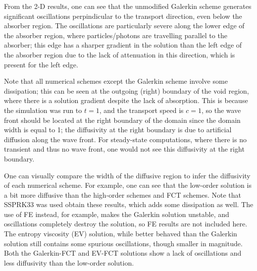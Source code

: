 From the 2-D results, one can see that the unmodified Galerkin scheme
generates significant oscillations perpindicular to the transport
direction, even below the absorber region. The oscillations are
particularly severe along the lower edge of the absorber region,
where particles/photons are travelling parallel to the absorber;
this edge has a sharper gradient in the solution than the left
edge of the absorber region due to the lack of attenuation in
this direction, which is present for the left edge.

Note that all numerical schemes except the Galerkin scheme involve some
dissipation; this can be seen at the outgoing (right) boundary of the void
region, where there is a solution gradient despite the lack of
absorption. This is because the simulation was run to $t=1$, and the transport
speed is $c=1$, so the wave front should be located at the right
boundary of the domain since the domain width is equal to 1;
the diffusivity at the right boundary is due to artificial diffusion
along the wave front.
For steady-state computations, where there is no transient and
thus no wave front, one would not see this diffusivity
at the right boundary.

One can visually compare the width
of the diffusive region to infer the diffusivity of each
numerical scheme. For example, one can see that the low-order
solution is a bit more diffusive than the high-order schemes
and FCT schemes.
Note that SSPRK33 was used obtain these results, which
adds some dissipation as well. The use of FE instead, for example,
makes the Galerkin solution unstable, and oscillations completely
destroy the solution, so FE results are not included here.
The entropy viscosity (EV) solution, while better behaved than the
Galerkin solution still contains some spurious oscillations,
though smaller in magnitude. Both the Galerkin-FCT and EV-FCT
solutions show a lack of oscillations and less diffusivity than the low-order
solution.

